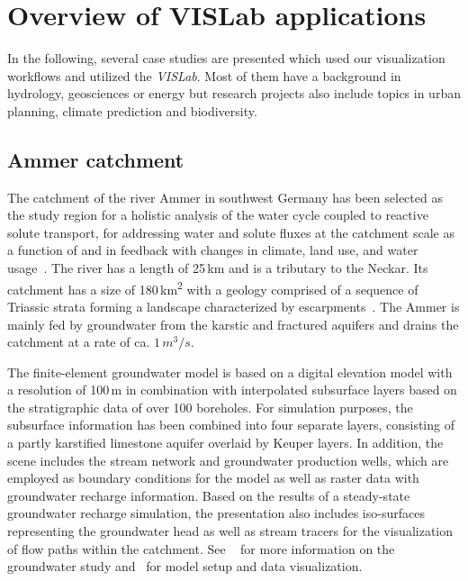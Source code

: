 \documentclass[twocolumn]{svjour3}          %
\begin{document}
\section{Overview of VISLab applications}
\label{overview-of-VISLab-applications}

In the following, several case studies are presented which used our visualization workflows and utilized the \emph{VISLab}. Most of them have a background in hydrology, geosciences or energy but research projects also include topics in urban planning, climate prediction and biodiversity.

\subsection{Ammer catchment}
\label{ammer-catchment}

The catchment of the river Ammer in southwest Germany has been selected as the study region for a holistic analysis of the water cycle coupled to reactive solute transport, for addressing water and solute fluxes at the catchment scale as a function of and in feedback with changes in climate, land use, and water usage~\cite{grathwohl:wessti}. The river has a length of 25\,km and is a tributary to the Neckar. Its catchment has a size of 180\,km\textsuperscript{2} with a geology comprised of a sequence of Triassic strata forming a landscape characterized by escarpments~\cite{selle:wessti}. The Ammer is mainly fed by groundwater from the karstic and fractured aquifers and drains the catchment at a rate of ca. $1\,m^3/s$.

The finite-element groundwater model is based on a digital elevation model with a resolution of 100\,m in combination with interpolated subsurface layers based on the stratigraphic data of over 100 boreholes. For simulation purposes, the subsurface information has been combined into four separate layers, consisting of a part\-ly karstified limestone aquifer overlaid by Keuper layers. In addition, the scene includes the stream network and groundwater production wells, which are employed as boundary conditions for the model as well as raster data with groundwater recharge information. Based on the results of a steady-state groundwater recharge simulation, the presentation also includes iso-surfaces representing the groundwater head as well as stream tracers for the visualization of flow paths within the catchment. See ~\cite{selle:wessti} for more information on the groundwater study and~\cite{rink:wessti} for model setup and data visualization.
\end{document}
